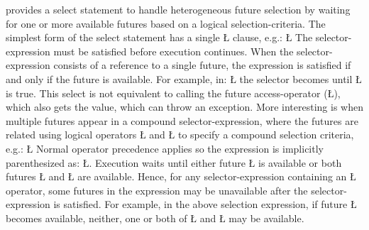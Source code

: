 \documentclass[openright,twoside]{report}
\begin{document}
\uC provides a select statement to handle heterogeneous future selection by waiting for one or more available futures based on a logical selection-criteria.
The simplest form of the select statement has a single \LGinlinetrue\LGbegin\lgrinde\L{}\endlgrinde\LGend{} clause, e.g.:
\LGinlinefalse\LGbegin\lgrinde
\L{}
\endlgrinde\LGend
{}%
The selector-expression must be satisfied before execution continues.
When the selector-expression consists of a reference to a single future, the expression is satisfied if and only if the future is available.
For example, in:
\LGinlinefalse\LGbegin\lgrinde
\L{}
\endlgrinde\LGend
the selector becomes  until \LGinlinetrue\LGbegin\lgrinde\L{}\endlgrinde\LGend{} is true.
This select is not equivalent to calling the future access-operator (\LGinlinetrue\LGbegin\lgrinde\L{}\endlgrinde\LGend{}), which also gets the value, which can throw an exception.
More interesting is when multiple futures appear in a compound selector-expression, where the futures are related using logical operators \LGinlinetrue\LGbegin\lgrinde\L{\LB{\|\,\|}}\endlgrinde\LGend{} and \LGinlinetrue\LGbegin\lgrinde\L{\LB{\&\&}}\endlgrinde\LGend{} to specify a compound selection criteria, e.g.:
\LGinlinefalse\LGbegin\lgrinde
\L{}
\endlgrinde\LGend
Normal operator precedence applies so the expression is implicitly parenthesized as: \LGinlinetrue\LGbegin\lgrinde\L{}\endlgrinde\LGend{}.
Execution waits until either future \LGinlinetrue\LGbegin\lgrinde\L{}\endlgrinde\LGend{} is available or both futures \LGinlinetrue\LGbegin\lgrinde\L{}\endlgrinde\LGend{} and \LGinlinetrue\LGbegin\lgrinde\L{}\endlgrinde\LGend{} are available.
Hence, for any selector-expression containing an \LGinlinetrue\LGbegin\lgrinde\L{\LB{\|\,\|}}\endlgrinde\LGend{} operator, some futures in the expression may be unavailable after the selector-expression is satisfied.
For example, in the above selection expression, if future \LGinlinetrue\LGbegin\lgrinde\L{}\endlgrinde\LGend{} becomes available, neither, one or both of \LGinlinetrue\LGbegin\lgrinde\L{}\endlgrinde\LGend{} and \LGinlinetrue\LGbegin\lgrinde\L{}\endlgrinde\LGend{} may be available.
\end{document}
